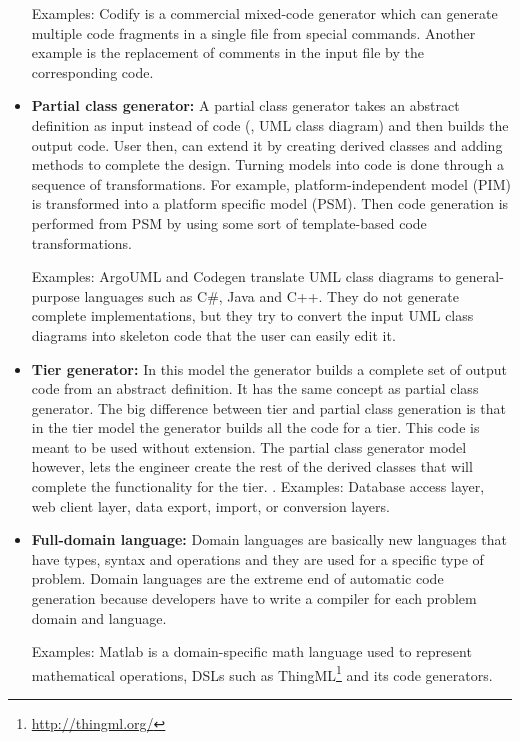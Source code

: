 \begin{itemize}
Examples: Codify is a commercial mixed-code generator which can generate multiple code fragments in a single file from special commands. Another example is the replacement of comments in the input file by the corresponding code.

\item \textbf{Partial class generator:} A partial class generator takes an abstract definition as input instead of code (\eg, UML class diagram) and then builds the output code. User then, can extend it by creating derived classes and adding methods to complete the design. Turning models into code is done through a sequence of transformations. For example, platform-independent model (PIM) is transformed into a platform specific model (PSM). Then code generation is performed from PSM by using some sort of template-based code transformations.

Examples: ArgoUML and Codegen translate UML class diagrams to general-purpose languages such as C\#, Java and C++. They do not generate complete implementations, but they try to convert the input UML class diagrams into skeleton code that the user can easily edit it. 

\item \textbf{Tier generator:} In this model the generator builds a complete set of output code from an abstract definition. It has the same concept as partial class generator. The big difference between tier and partial class generation is that in the tier model the generator builds all the code for a tier. This code is meant to be used without extension. The partial class generator model however, lets the engineer create the rest of the derived classes that will complete the functionality for the tier.
.
Examples: Database access layer, web client layer, data export, import, or conversion layers.

\item \textbf{Full-domain language:} Domain languages are basically new languages that have types, syntax and operations and they are used for a specific type of problem. 
Domain languages are the extreme end of automatic code generation because developers have to write a compiler for each problem domain and language. 

Examples: Matlab is a domain-specific math language used to represent mathematical operations, DSLs such as ThingML\footnote{\url{http://thingml.org/}} and its code generators.

\end{itemize}
